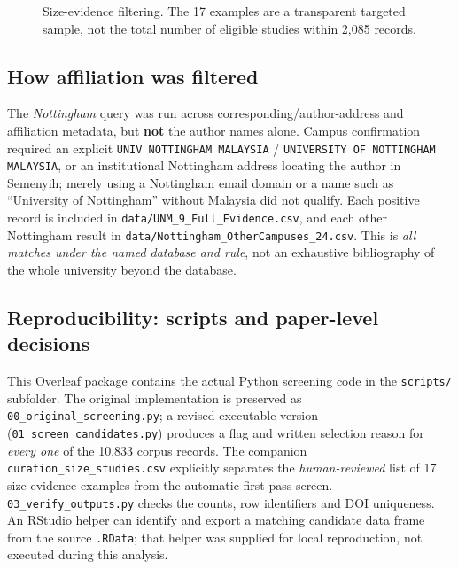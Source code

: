 \documentclass[10pt,a4paper]{article}
\begin{document}
\begin{figure}[H]\centering
{}
\caption{Size-evidence filtering. The 17 examples are a transparent targeted sample, not the total number of eligible studies within 2,085 records.}\end{figure}

\subsection{How affiliation was filtered}
The \emph{Nottingham} query was run across corresponding/author-address and affiliation metadata, but \textbf{not} the author names alone. Campus confirmation required an explicit \texttt{UNIV NOTTINGHAM MALAYSIA} / \texttt{UNIVERSITY OF NOTTINGHAM MALAYSIA}, or an institutional Nottingham address locating the author in Semenyih; merely using a Nottingham email domain or a name such as ``University of Nottingham'' without Malaysia did not qualify. Each positive record is included in \texttt{data/UNM\_9\_Full\_Evidence.csv}, and each other Nottingham result in \texttt{data/Nottingham\_OtherCampuses\_24.csv}. This is \emph{all matches under the named database and rule}, not an exhaustive bibliography of the whole university beyond the database.

\subsection{Reproducibility: scripts and paper-level decisions}
This Overleaf package contains the actual Python screening code in the \texttt{scripts/} subfolder. The original implementation is preserved as \texttt{00\_original\_screening.py}; a revised executable version (\texttt{01\_screen\_candidates.py}) produces a flag and written selection reason for \emph{every one} of the 10,833 corpus records. The companion \texttt{curation\_size\_studies.csv} explicitly separates the \emph{human-reviewed} list of 17 size-evidence examples from the automatic first-pass screen. \texttt{03\_verify\_outputs.py} checks the counts, row identifiers and DOI uniqueness. An RStudio helper can identify and export a matching candidate data frame from the source \texttt{.RData}; that helper was supplied for local reproduction, not executed during this analysis.
\end{document}
